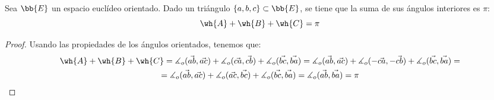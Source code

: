 \begin{teo}
    Sea $\bb{E}$ un espacio euclídeo orientado. Dado un triángulo $\{a,b,c\}\subset \bb{E}$, se tiene que la suma de sus ángulos interiores es $\pi$:
    \begin{equation*}
        \wh{A} + \wh{B} + \wh{C} = \pi
    \end{equation*}    
    \begin{figure}[H]
        \centering
    \end{figure}
\end{teo}
\begin{proof} Usando las propiedades de los ángulos orientados, tenemos que:
\begin{multline*}
    \wh{A} + \wh{B} + \wh{C}
    = \measuredangle_o (\vec{ab}, \vec{ac})+ \measuredangle_o (\vec{ca}, \vec{cb}) + \measuredangle_o (\vec{bc}, \vec{ba})
    = \measuredangle_o (\vec{ab}, \vec{ac})+ \measuredangle_o (-\vec{ca}, -\vec{cb}) + \measuredangle_o (\vec{bc}, \vec{ba}) =\\
    = \measuredangle_o (\vec{ab}, \vec{ac})+ \measuredangle_o (\vec{ac}, \vec{bc}) + \measuredangle_o (\vec{bc}, \vec{ba}) = \measuredangle_o (\vec{ab}, \vec{ba}) = \pi
\end{multline*}
\end{proof}


